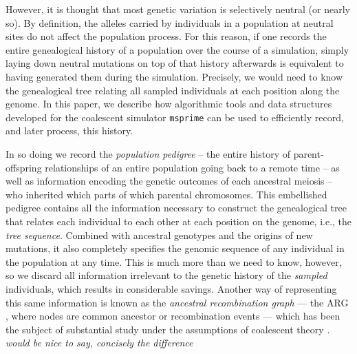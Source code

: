 \documentclass{article}
\newcommand{\msprime}{\texttt{msprime}}
\newcommand{\jda}[1]{{\em \color{cyan} #1}}
\begin{document}
However, it is thought that most genetic variation is selectively neutral (or nearly so).
By definition, the alleles carried by individuals in a population at neutral sites
do not affect the population process.
For this reason, if one records the entire genealogical history of a population over the course of a simulation,
simply laying down neutral mutations on top of that history afterwards
is equivalent to having generated them during the simulation.
Precisely, we would need to know the genealogical tree relating all sampled individuals
at each position along the genome.
In this paper, we describe how algorithmic tools and data structures developed for the 
coalescent simulator \msprime{}
can be used to efficiently record, and later process, this history.

In so doing we record the \emph{population pedigree} --
the entire history of parent-offspring relationships of an entire population going back to a remote time --
as well as information encoding the genetic outcomes of each ancestral meiosis --
who inherited which parts of which parental chromosomes.
This embellished pedigree contains all the information necessary
to construct the genealogical tree that relates each individual to each other
at each position on the genome, i.e., the \emph{tree sequence}.
Combined with ancestral genotypes and the origins of new mutations,
it also completely specifies the genomic sequence of any individual in the population at any time.
This is much more than we need to know, however,
so we discard all information irrelevant to the genetic history
of the \emph{sampled} individuals,
which results in considerable savings.
Another way of representing this same information
is known as the \emph{ancestral recombination graph} ---
the {ARG} \citep{griffiths1997ancestral},
where nodes are common ancestor or recombination events ---
which has been the subject of substantial study
under the assumptions of coalescent theory \citep{wiuf1997number,wiuf1999ancestry,marjoram2006coalescent,wilton2015smc}.
\jda{would be nice to say, concisely the difference}
\end{document}
